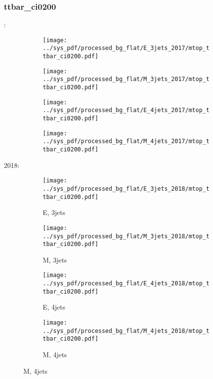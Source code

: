 \documentclass{beamer}
\begin{document}
\begin{frame}
\frametitle{ttbar_ci0200}
\fontsize{5}{1}:
\begin{figure}
\centering
\begin{subfigure}[b]{0.24\textwidth}
\texttt{[image: ../sys\_pdf/processed\_bg\_flat/E\_3jets\_2017/mtop\_ttbar\_ci0200.pdf]}
\end{subfigure}
\begin{subfigure}[b]{0.24\textwidth}
\texttt{[image: ../sys\_pdf/processed\_bg\_flat/M\_3jets\_2017/mtop\_ttbar\_ci0200.pdf]}
\end{subfigure}
\begin{subfigure}[b]{0.24\textwidth}
\texttt{[image: ../sys\_pdf/processed\_bg\_flat/E\_4jets\_2017/mtop\_ttbar\_ci0200.pdf]}
\end{subfigure}
\begin{subfigure}[b]{0.24\textwidth}
\texttt{[image: ../sys\_pdf/processed\_bg\_flat/M\_4jets\_2017/mtop\_ttbar\_ci0200.pdf]}
\end{subfigure}
\end{figure}
2018:
\begin{figure}
\centering
\begin{subfigure}[b]{0.24\textwidth}
\texttt{[image: ../sys\_pdf/processed\_bg\_flat/E\_3jets\_2018/mtop\_ttbar\_ci0200.pdf]}
\captionsetup{font=tiny}
\caption{E, 3jets}
\end{subfigure}
\begin{subfigure}[b]{0.24\textwidth}
\texttt{[image: ../sys\_pdf/processed\_bg\_flat/M\_3jets\_2018/mtop\_ttbar\_ci0200.pdf]}
\captionsetup{font=tiny}
\caption{M, 3jets}
\end{subfigure}
\begin{subfigure}[b]{0.24\textwidth}
\texttt{[image: ../sys\_pdf/processed\_bg\_flat/E\_4jets\_2018/mtop\_ttbar\_ci0200.pdf]}
\captionsetup{font=tiny}
\caption{E, 4jets}
\end{subfigure}
\begin{subfigure}[b]{0.24\textwidth}
\texttt{[image: ../sys\_pdf/processed\_bg\_flat/M\_4jets\_2018/mtop\_ttbar\_ci0200.pdf]}
\captionsetup{font=tiny}
\caption{M, 4jets}
\end{subfigure}
\end{figure}
\end{frame}
\end{document}
